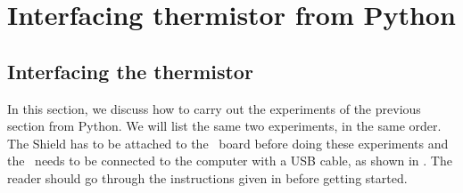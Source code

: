 \section{Interfacing thermistor from Python}
\subsection{Interfacing the thermistor}
In this section, we discuss how to carry out the experiments of the
previous section from Python.  We will list the same two experiments,
in the same order.  The Shield has to be attached to the \arduino\ board
before doing these experiments and the \arduino\ needs to be connected to the computer
with a USB cable, as shown in .
The reader should go through the instructions given in
 before getting started.

